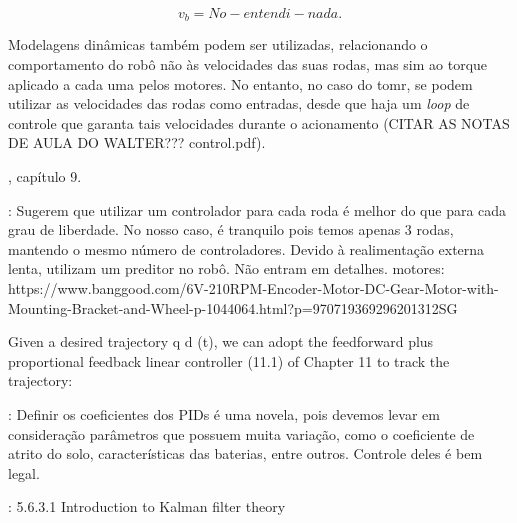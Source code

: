 \begin{equation}
  v_b = No-entendi-nada.
  \label{eq:twist}
\end{equation}

Modelagens dinâmicas também podem ser utilizadas, relacionando o comportamento do robô não às velocidades das suas rodas, mas sim ao torque aplicado a cada uma pelos motores. No entanto, no caso do \acrshort{tomr}, se podem utilizar as velocidades das rodas como entradas, desde que haja um \emph{loop} de controle que garanta tais velocidades durante o acionamento (CITAR AS NOTAS DE AULA DO WALTER??? control.pdf).

\cite{lynch2017modern}, capítulo 9.

\cite{rojas2006holonomic}: Sugerem que utilizar um controlador para cada roda é melhor do que para cada grau de liberdade. No nosso caso, é tranquilo pois temos apenas 3 rodas, mantendo o mesmo número de controladores. Devido à realimentação externa lenta, utilizam um preditor no robô. Não entram em detalhes.
motores:
https://www.banggood.com/6V-210RPM-Encoder-Motor-DC-Gear-Motor-with-Mounting-Bracket-and-Wheel-p-1044064.html?p=970719369296201312SG

Given a desired trajectory q d (t), we can adopt the feedforward plus proportional feedback linear controller (11.1) of Chapter 11 to track the trajectory: \cite{lynch2017modern}

\cite{samani2007comprehensive}: Definir os coeficientes dos PIDs é uma novela, pois devemos levar em consideração parâmetros que possuem muita variação, como o coeficiente de atrito do solo, características das baterias, entre outros. Controle deles é bem legal.





\cite{siegwart2011introduction}: 5.6.3.1 Introduction to Kalman filter theory

